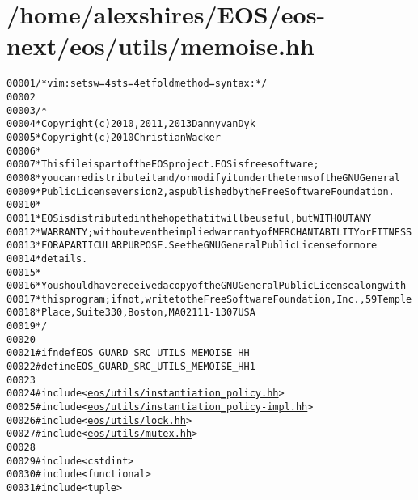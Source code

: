 \hypertarget{memoise_8hh_source}{
\section{/home/alexshires/EOS/eos-\/next/eos/utils/memoise.hh}
}


\begin{footnotesize}\begin{alltt}
00001 \textcolor{comment}{/* vim: set sw=4 sts=4 et foldmethod=syntax : */}
00002 
00003 \textcolor{comment}{/*}
00004 \textcolor{comment}{ * Copyright (c) 2010, 2011, 2013 Danny van Dyk}
00005 \textcolor{comment}{ * Copyright (c) 2010 Christian Wacker}
00006 \textcolor{comment}{ *}
00007 \textcolor{comment}{ * This file is part of the EOS project. EOS is free software;}
00008 \textcolor{comment}{ * you can redistribute it and/or modify it under the terms of the GNU General}
00009 \textcolor{comment}{ * Public License version 2, as published by the Free Software Foundation.}
00010 \textcolor{comment}{ *}
00011 \textcolor{comment}{ * EOS is distributed in the hope that it will be useful, but WITHOUT ANY}
00012 \textcolor{comment}{ * WARRANTY; without even the implied warranty of MERCHANTABILITY or FITNESS}
00013 \textcolor{comment}{ * FOR A PARTICULAR PURPOSE.  See the GNU General Public License for more}
00014 \textcolor{comment}{ * details.}
00015 \textcolor{comment}{ *}
00016 \textcolor{comment}{ * You should have received a copy of the GNU General Public License along with}
00017 \textcolor{comment}{ * this program; if not, write to the Free Software Foundation, Inc., 59 Temple}
00018 \textcolor{comment}{ * Place, Suite 330, Boston, MA  02111-1307  USA}
00019 \textcolor{comment}{ */}
00020 
00021 \textcolor{preprocessor}{#ifndef EOS\_GUARD\_SRC\_UTILS\_MEMOISE\_HH}
\hypertarget{memoise_8hh_source_l00022}{}\hyperlink{memoise_8hh_a634782acc6719bb8865b60fcff17148e}{00022} \textcolor{preprocessor}{}\textcolor{preprocessor}{#define EOS\_GUARD\_SRC\_UTILS\_MEMOISE\_HH 1}
00023 \textcolor{preprocessor}{}
00024 \textcolor{preprocessor}{#include <\hyperlink{instantiation__policy_8hh}{eos/utils/instantiation_policy.hh}>}
00025 \textcolor{preprocessor}{#include <\hyperlink{instantiation__policy-impl_8hh}{eos/utils/instantiation_policy-impl.hh}>}
00026 \textcolor{preprocessor}{#include <\hyperlink{lock_8hh}{eos/utils/lock.hh}>}
00027 \textcolor{preprocessor}{#include <\hyperlink{mutex_8hh}{eos/utils/mutex.hh}>}
00028 
00029 \textcolor{preprocessor}{#include <cstdint>}
00030 \textcolor{preprocessor}{#include <functional>}
00031 \textcolor{preprocessor}{#include <tuple>}

\end{alltt}
\end{footnotesize}
